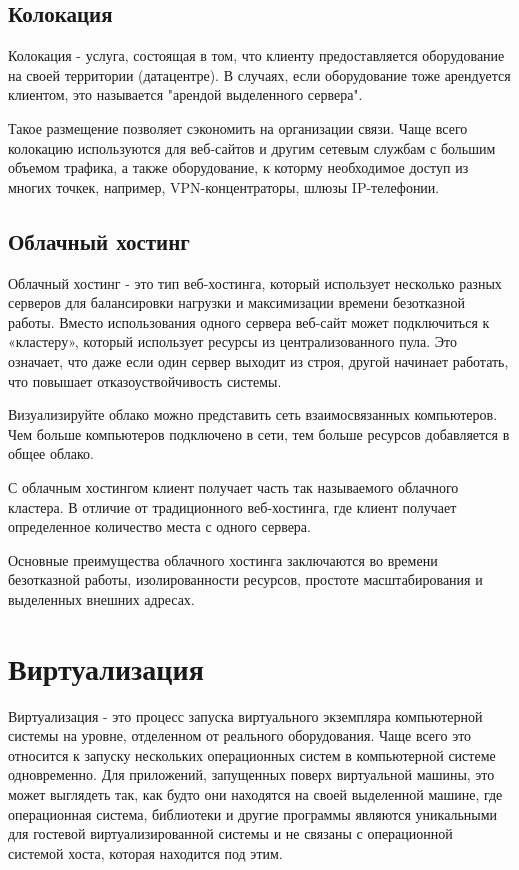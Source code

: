 \subsection{Колокация}\label{sec:colo_hosting}
Колокация - услуга, состоящая в том, что клиенту предоставляется оборудование на своей территории (датацентре). В случаях, если оборудование тоже арендуется клиентом, это называется "арендой выделенного сервера".

Такое размещение позволяет сэкономить на организации связи. Чаще всего колокацию используются для веб-сайтов и другим сетевым службам с большим объемом трафика, а также оборудование, к которму необходимое  доступ из многих точкек, например, VPN-концентраторы, шлюзы IP-телефонии.

\subsection{Облачный хостинг}\label{sec:cloud_hosting}
Облачный хостинг - это тип веб-хостинга, который использует несколько разных серверов для балансировки нагрузки и максимизации времени безотказной работы. Вместо использования одного сервера веб-сайт может подключиться к «кластеру», который использует ресурсы из централизованного пула. Это означает, что даже если один сервер выходит из строя, другой начинает работать, что повышает отказоуствойчивость системы.

Визуализируйте облако можно представить сеть взаимосвязанных компьютеров. Чем больше компьютеров подключено в сети, тем больше ресурсов добавляется в общее облако.

С облачным хостингом клиент получает часть так называемого облачного кластера. В отличие от традиционного веб-хостинга, где клиент получает определенное количество места с одного сервера.

Основные преимущества облачного хостинга заключаются во времени безотказной работы, изолированности ресурсов, простоте масштабирования и выделенных внешних адресах.

\section{Виртуализация}\label{sec:ch1/sec2}
Виртуализация - это процесс запуска виртуального экземпляра компьютерной системы на уровне, отделенном от реального оборудования. Чаще всего это относится к запуску нескольких операционных систем в компьютерной системе одновременно. Для приложений, запущенных поверх виртуальной машины, это может выглядеть так, как будто они находятся на своей выделенной машине, где операционная система, библиотеки и другие программы являются уникальными для гостевой виртуализированной системы и не связаны с операционной системой хоста, которая находится под этим.

